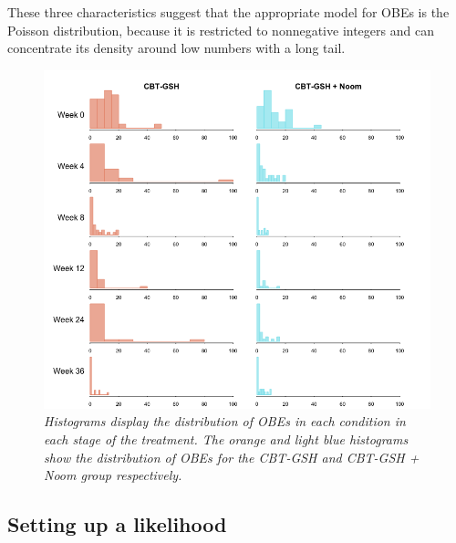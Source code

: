 \documentclass{article}
\begin{document}
These three characteristics suggest that the appropriate model for OBEs is the Poisson distribution, because it is restricted to nonnegative integers and can concentrate its density around low numbers with a long tail.
%
\begin{figure}[H]
\begin{center}
\includegraphics[width=\textwidth, height=\textheight, keepaspectratio]{noom_hist.png}
\end{center}
\caption{\emph{Histograms display the distribution of OBEs in each condition in each stage of the treatment. The orange and light blue histograms show the distribution of OBEs for the CBT-GSH and CBT-GSH  + Noom group respectively.}}
\end{figure}
%
\subsection*{Setting up a likelihood}
\end{document}
